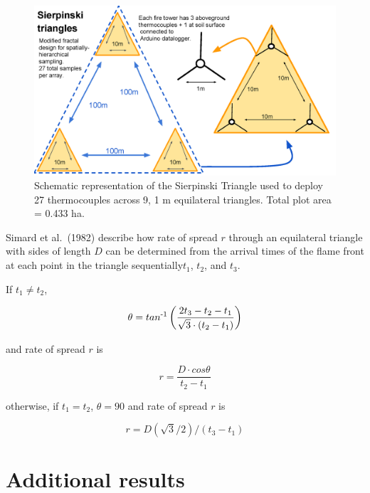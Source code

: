 \documentclass[
]{article}
\begin{document}
\begin{figure}

{\centering \includegraphics[width=1\linewidth]{figures/SierpinskiTriangle} 

}

\caption{Schematic representation of the Sierpinski Triangle used to deploy 27 thermocouples across 9, 1 m equilateral triangles. Total plot area = 0.433 ha. \label{fig:triangle}}\label{fig:scheme}
\end{figure}

Simard et al.~(1982) describe how rate of spread \(r\) through an
equilateral triangle with sides of length \(D\) can be determined from
the arrival times of the flame front at each point in the triangle
sequentially\textemdash \(t_1\), \(t_2\), and \(t_3\).

If \(t_1 \neq t_2\),

\begin{equation} \label{eq:simard1}
\theta = tan\textsuperscript{-1} \left( \dfrac{2t_3 - t_2 - t_1}{\sqrt{3}\cdot (t_2 - t_1)}\right) 
\end{equation}

and rate of spread \(r\) is

\begin{equation} \label{eq:simard2}
r = \dfrac{D\cdot cos\theta}{t_2 - t_1}
\end{equation}

otherwise, if \(t_1 = t_2\), \(\theta = 90\) and rate of spread \(r\) is

\begin{equation} \label{eq:simard3}
r = D (\sqrt{3}/2)/({t_3 - t_1})
\end{equation}

\hypertarget{additional-results}{%
\section{Additional results}\label{additional-results}}
\end{document}
